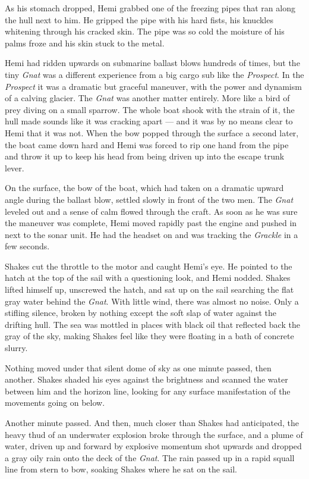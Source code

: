 \documentclass[
]{scrbook}
\begin{document}
As his stomach dropped, Hemi grabbed one of the freezing pipes that ran
along the hull next to him. He gripped the pipe with his hard fists, his
knuckles whitening through his cracked skin. The pipe was so cold the
moisture of his palms froze and his skin stuck to the metal.

Hemi had ridden upwards on submarine ballast blows hundreds of times,
but the tiny \emph{Gnat} was a different experience from a big cargo sub
like the \emph{Prospect}. In the \emph{Prospect} it was a dramatic but
graceful maneuver, with the power and dynamism of a calving glacier. The
\emph{Gnat} was another matter entirely. More like a bird of prey diving
on a small sparrow. The whole boat shook with the strain of it, the hull
made sounds like it was cracking apart --- and it was by no means clear
to Hemi that it was not. When the bow popped through the surface a
second later, the boat came down hard and Hemi was forced to rip one
hand from the pipe and throw it up to keep his head from being driven up
into the escape trunk lever.

On the surface, the bow of the boat, which had taken on a dramatic
upward angle during the ballast blow, settled slowly in front of the two
men. The \emph{Gnat} leveled out and a sense of calm flowed through the
craft. As soon as he was sure the maneuver was complete, Hemi moved
rapidly past the engine and pushed in next to the sonar unit. He had the
headset on and was tracking the \emph{Grackle} in a few seconds.

Shakes cut the throttle to the motor and caught Hemi's eye. He pointed
to the hatch at the top of the sail with a questioning look, and Hemi
nodded. Shakes lifted himself up, unscrewed the hatch, and sat up on the
sail searching the flat gray water behind the \emph{Gnat}. With little
wind, there was almost no noise. Only a stifling silence, broken by
nothing except the soft slap of water against the drifting hull. The sea
was mottled in places with black oil that reflected back the gray of the
sky, making Shakes feel like they were floating in a bath of concrete
slurry.

Nothing moved under that silent dome of sky as one minute passed, then
another. Shakes shaded his eyes against the brightness and scanned the
water between him and the horizon line, looking for any surface
manifestation of the movements going on below.

Another minute passed. And then, much closer than Shakes had
anticipated, the heavy thud of an underwater explosion broke through the
surface, and a plume of water, driven up and forward by explosive
momentum shot upwards and dropped a gray oily rain onto the deck of the
\emph{Gnat}. The rain passed up in a rapid squall line from stern to
bow, soaking Shakes where he sat on the sail.
\end{document}
